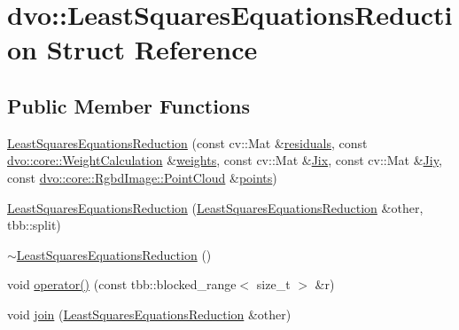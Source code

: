 \hypertarget{structdvo_1_1_least_squares_equations_reduction}{}\section{dvo\+:\+:Least\+Squares\+Equations\+Reduction Struct Reference}
\label{structdvo_1_1_least_squares_equations_reduction}
\subsection*{Public Member Functions}
\begin{DoxyCompactItemize}
\item 
\mbox{\hyperlink{structdvo_1_1_least_squares_equations_reduction_ae69114a4911fd35ce60a4696d15ce5a1}{Least\+Squares\+Equations\+Reduction}} (const cv\+::\+Mat \&\mbox{\hyperlink{structdvo_1_1_least_squares_equations_reduction_a6140e6f4c600016951877b7f79efeec1}{residuals}}, const \mbox{\hyperlink{classdvo_1_1core_1_1_weight_calculation}{dvo\+::core\+::\+Weight\+Calculation}} \&\mbox{\hyperlink{structdvo_1_1_least_squares_equations_reduction_a135763297b1e3bcee21189e0f5014fe4}{weights}}, const cv\+::\+Mat \&\mbox{\hyperlink{structdvo_1_1_least_squares_equations_reduction_a513436c876416261efe1d99188f8117a}{Jix}}, const cv\+::\+Mat \&\mbox{\hyperlink{structdvo_1_1_least_squares_equations_reduction_a7d8b6e08f0baf9580e0d5eb00776911f}{Jiy}}, const \mbox{\hyperlink{structdvo_1_1core_1_1_rgbd_image_a56820965eb98427d06e6733fe333cdc5}{dvo\+::core\+::\+Rgbd\+Image\+::\+Point\+Cloud}} \&\mbox{\hyperlink{structdvo_1_1_least_squares_equations_reduction_a31ca8e056a271c3f3c99140e679a55c1}{points}})
\item 
\mbox{\hyperlink{structdvo_1_1_least_squares_equations_reduction_a0d615509ae3ef7176e8f9504065de1b0}{Least\+Squares\+Equations\+Reduction}} (\mbox{\hyperlink{structdvo_1_1_least_squares_equations_reduction}{Least\+Squares\+Equations\+Reduction}} \&other, tbb\+::split)
\item 
\mbox{\hyperlink{structdvo_1_1_least_squares_equations_reduction_aebf5509fd667020911a060bb93df51c2}{$\sim$\+Least\+Squares\+Equations\+Reduction}} ()
\item 
void \mbox{\hyperlink{structdvo_1_1_least_squares_equations_reduction_a4730c4255382ba919c088e70cbea9d44}{operator()}} (const tbb\+::blocked\+\_\+range$<$ size\+\_\+t $>$ \&r)
\item 
void \mbox{\hyperlink{structdvo_1_1_least_squares_equations_reduction_a35553c6631e0ff25089aea292619bf6b}{join}} (\mbox{\hyperlink{structdvo_1_1_least_squares_equations_reduction}{Least\+Squares\+Equations\+Reduction}} \&other)
\end{DoxyCompactItemize}
